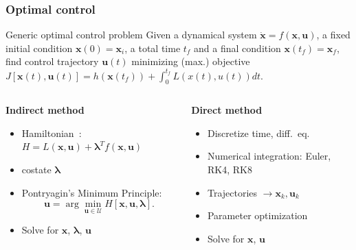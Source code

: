 \documentclass{beamer}
\begin{document}
\begin{frame}
    \frametitle{Optimal control}
    \begin{block}{Generic optimal control problem}
        Given a dynamical system \(\dot{\mathbf{x}} = f(\mathbf{x}, \mathbf{u})\), a fixed initial condition \(\mathbf{x}(0) = \mathbf{x}_i\), a total time \(t_f\) and a final condition \(\mathbf{x}(t_f) = \mathbf{x}_f\), find control trajectory \(\mathbf{u}(t)\) minimizing (max.) objective \(J[\mathbf{x}(t), \mathbf{u}(t)] = h(\mathbf{x}(t_f))+\int_0^{t_f} L(x(t), u(t)) dt\).
    \end{block}
    \begin{columns}
        \begin{column}{0.5\linewidth}
            \begin{center}
                \textbf{Indirect method}
            \end{center}
            \begin{itemize}
                \item Hamiltonian~\cite{bertsekas}: \(H = L(\mathbf{x}, \mathbf{u}) + \mathbf{\lambda}^T f(\mathbf{x}, \mathbf{u})\)
                \item costate \(\mathbf{\lambda}\)
                \item Pontryagin's Minimum Principle:
                \begin{equation}
                    \mathbf{u} = \arg \min_{\mathbf{u} \in \mathcal{U}} H[\mathbf{x}, \mathbf{u}, \mathbf{\lambda}].
                \end{equation}
                \item Solve for \(\mathbf{x}\), \(\mathbf{\lambda}\), \(\mathbf{u}\)
            \end{itemize}
        \end{column}
        \begin{column}{0.5\linewidth}
            \begin{center}
                \textbf{Direct method}
            \end{center}
            \begin{itemize}
                \item Discretize time, diff.\ eq.
                \item Numerical integration: Euler, RK4, RK8
                \item Trajectories \(\rightarrow \mathbf{x}_k, \mathbf{u}_k\)
                \item Parameter optimization
                \item Solve for \(\mathbf{x}\), \(\mathbf{u}\)
            \end{itemize}
        \end{column}
    \end{columns}
\end{frame}
\end{document}
